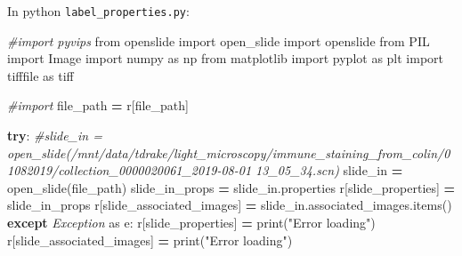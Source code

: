 \documentclass[
]{book}
\newenvironment{Shaded}{\begin{snugshade}}{\end{snugshade}}
\newcommand{\BuiltInTok}[1]{#1}
\newcommand{\CommentTok}[1]{\textcolor[rgb]{0.56,0.35,0.01}{\textit{#1}}}
\newcommand{\ControlFlowTok}[1]{\textcolor[rgb]{0.13,0.29,0.53}{\textbf{#1}}}
\newcommand{\FunctionTok}[1]{\textcolor[rgb]{0.00,0.00,0.00}{#1}}
\newcommand{\ImportTok}[1]{#1}
\newcommand{\NormalTok}[1]{#1}
\newcommand{\OperatorTok}[1]{\textcolor[rgb]{0.81,0.36,0.00}{\textbf{#1}}}
\newcommand{\OtherTok}[1]{\textcolor[rgb]{0.56,0.35,0.01}{#1}}
\newcommand{\PreprocessorTok}[1]{\textcolor[rgb]{0.56,0.35,0.01}{\textit{#1}}}
\newcommand{\SpecialCharTok}[1]{\textcolor[rgb]{0.00,0.00,0.00}{#1}}
\newcommand{\StringTok}[1]{\textcolor[rgb]{0.31,0.60,0.02}{#1}}
\begin{document}
\begin{Shaded}
\end{Shaded}

In python \texttt{label\_properties.py}:

\begin{Shaded}
\begin{Highlighting}[]
\CommentTok{\#import pyvips}
\ImportTok{from}\NormalTok{ openslide }\ImportTok{import}\NormalTok{ open\_slide}
\ImportTok{import}\NormalTok{ openslide}
\ImportTok{from}\NormalTok{ PIL }\ImportTok{import}\NormalTok{ Image}
\ImportTok{import}\NormalTok{ numpy }\ImportTok{as}\NormalTok{ np}
\ImportTok{from}\NormalTok{ matplotlib }\ImportTok{import}\NormalTok{ pyplot }\ImportTok{as}\NormalTok{ plt}
\ImportTok{import}\NormalTok{ tifffile }\ImportTok{as}\NormalTok{ tiff}

\CommentTok{\#import}
\NormalTok{file\_path }\OperatorTok{=}\NormalTok{ r[}\StringTok{\textquotesingle{}file\_path\textquotesingle{}}\NormalTok{]}

\ControlFlowTok{try}\NormalTok{:}
  \CommentTok{\#slide\_in = open\_slide(\textquotesingle{}/mnt/data/tdrake/light\_microscopy/immune\_staining\_from\_colin/01082019/collection\_0000020061\_2019{-}08{-}01 13\_05\_34.scn\textquotesingle{})}
\NormalTok{  slide\_in }\OperatorTok{=}\NormalTok{ open\_slide(file\_path)}
\NormalTok{  slide\_in\_props }\OperatorTok{=}\NormalTok{ slide\_in.properties}
\NormalTok{  r[}\StringTok{\textquotesingle{}slide\_properties\textquotesingle{}}\NormalTok{] }\OperatorTok{=}\NormalTok{ slide\_in\_props}
\NormalTok{  r[}\StringTok{\textquotesingle{}slide\_associated\_images\textquotesingle{}}\NormalTok{] }\OperatorTok{=}\NormalTok{ slide\_in.associated\_images.items()}
\ControlFlowTok{except} \PreprocessorTok{Exception} \ImportTok{as}\NormalTok{ e:}
\NormalTok{  r[}\StringTok{\textquotesingle{}slide\_properties\textquotesingle{}}\NormalTok{] }\OperatorTok{=} \BuiltInTok{print}\NormalTok{(}\StringTok{"Error loading"}\NormalTok{)}
\NormalTok{  r[}\StringTok{\textquotesingle{}slide\_associated\_images\textquotesingle{}}\NormalTok{] }\OperatorTok{=} \BuiltInTok{print}\NormalTok{(}\StringTok{"Error loading"}\NormalTok{)}
\end{Highlighting}
\end{Shaded}
\end{document}
